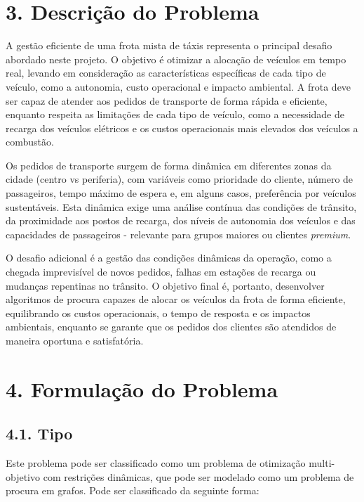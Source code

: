 \documentclass[a4paper]{article}
\begin{document}
\pagebreak

\section*{3. Descrição do Problema}

\noindent A gestão eficiente de uma frota mista de táxis representa o principal desafio abordado neste projeto. O objetivo é otimizar a alocação de veículos em tempo real, levando em consideração as características específicas de cada tipo de veículo, como a autonomia, custo operacional e impacto ambiental. A frota deve ser capaz de atender aos pedidos de transporte de forma rápida e eficiente, enquanto respeita as limitações de cada tipo de veículo, como a necessidade de recarga dos veículos elétricos e os custos operacionais mais elevados dos veículos a combustão.

\vspace{0.5cm}

\noindent Os pedidos de transporte surgem de forma dinâmica em diferentes zonas da cidade (centro vs periferia), com variáveis como prioridade do cliente, número de passageiros, tempo máximo de espera e, em alguns casos, preferência por veículos sustentáveis. Esta dinâmica exige uma análise contínua das condições de trânsito, da proximidade aos postos de recarga, dos níveis de autonomia dos veículos e das capacidades de passageiros - relevante para grupos maiores ou clientes \textit{premium}.

\vspace{0.5cm}

\noindent O desafio adicional é a gestão das condições dinâmicas da operação, como a chegada imprevisível de novos pedidos, falhas em estações de recarga ou mudanças repentinas no trânsito. O objetivo final é, portanto, desenvolver algoritmos de procura capazes de alocar os veículos da frota de forma eficiente, equilibrando os custos operacionais, o tempo de resposta e os impactos ambientais, enquanto se garante que os pedidos dos clientes são atendidos de maneira oportuna e satisfatória.

\pagebreak

\section*{4. Formulação do Problema}

\subsection*{4.1. Tipo}
\noindent Este problema pode ser classificado como um problema de otimização multi-objetivo com restrições dinâmicas, que pode ser modelado como um problema de procura em grafos. Pode ser classificado da seguinte forma:
\end{document}
